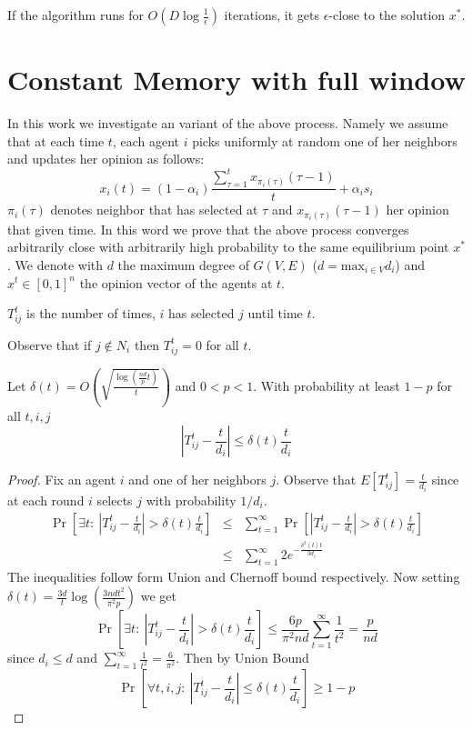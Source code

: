 \begin{Col}
If the algorithm runs for $O(D \log \frac{1}{\epsilon})$ iterations, it gets $\epsilon$-close to the solution $x^*$.
\end{Col}

\section{Constant Memory with full window}
In this work we investigate an variant of the above process. Namely we assume that at each time $t$, each agent $i$ picks uniformly at random one of her neighbors and updates her opinion as follows: $$x_i(t) = (1-\alpha_i)\frac{\sum_{\tau=1}^tx_{\pi_i(\tau)}(\tau-1)}{t} + \alpha_i s_i$$ $\pi_i(\tau)$ denotes neighbor that has selected at $\tau$ and $x_{\pi_i(\tau)}(\tau-1)$ her opinion that given time. In this word we prove that the above process converges arbitrarily close with arbitrarily high probability to the same equilibrium point $x^*$.
We denote with $d$ the maximum degree of $G(V,E)$ ($d=\text{max}_{i \in V}d_i$) and $x^t \in [0,1]^n$ the opinion vector of the agents at $t$.

\begin{definition}
$T_{ij}^t$ is the number of times, $i$ has selected $j$ until time $t$.
\end{definition}

\noindent Observe that if $j \notin N_i$ then $T_{ij}^t=0$ for all $t$.

\begin{lemma}
Let $\delta(t) = O(\sqrt{\frac{\log(\frac{nd}{p}t)}{t}})$ and $0<p<1$. With probability at least $1-p$ for all $t,i,j$
$$|T_{ij}^t - \frac{t}{d_i}|\leq \delta(t)\frac{t}{d_i}$$
\end{lemma}
\begin{proof}
Fix an agent $i$ and one of her neighbors $j$. Observe that $E[T_{ij}^t] = \frac{t}{d_i}$ since at each round $i$ selects $j$ with probability $1/d_i$.
\begin{eqnarray*}
\Pr[\exists t:~|T^t_{ij}-\frac{t}{d_i}| > \delta(t)\frac{t}{d_i}] &\leq& \sum_{t=1}^{\infty}\Pr[|T^t_{ij}-\frac{t}{d_i}|>\delta(t)\frac{t}{d_i}]\\
&\leq& \sum_{t=1}^{\infty}2e^{-\frac{\delta^2(t)t}{3d_i}}
\end{eqnarray*}
The inequalities follow form Union and Chernoff bound respectively. Now setting $\delta(t) = \frac{3d}{t}\log(\frac{3ndt^2}{\pi^2 p})$ we get $$\Pr[\exists t:~|T^t_{ij}-\frac{t}{d_i}| > \delta(t)\frac{t}{d_i}] \leq \frac{6p}{\pi^2nd}\sum_{t=1}^{\infty}\frac{1}{t^2}=\frac{p}{nd}$$
since $d_i \leq d$ and $\sum_{t=1}^{\infty}\frac{1}{t^2}=\frac{6}{\pi^2}$. Then by Union Bound $$\Pr[\forall t,i,j:~ |T_{ij}^t - \frac{t}{d_i}|\leq \delta(t)\frac{t}{d_i}] \geq 1-p$$
\end{proof}

